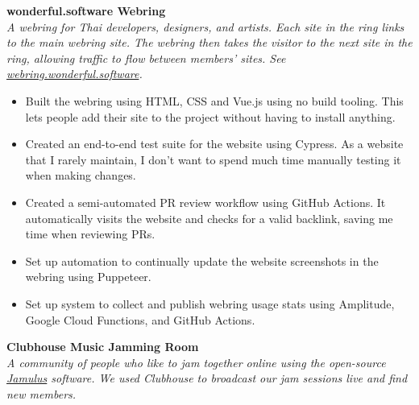 \documentclass[a4paper]{article}
\begin{document}
\textbf{wonderful.software Webring}\\
\textit{A webring for Thai developers, designers, and artists. Each site in the ring links to the main webring site. The webring then takes the visitor to the next site in the ring, allowing traffic to flow between members’ sites. See \href{https://webring.wonderful.software/}{webring.wonderful.software}.}

\begin{itemize} \itemsep 1pt
    
	\item Built the webring using HTML, CSS and Vue.js using no build tooling. This lets people add their site to the project without having to install anything.
    
	\item Created an end-to-end test suite for the website using Cypress. As a website that I rarely maintain, I don’t want to spend much time manually testing it when making changes.
    
	\item Created a semi-automated PR review workflow using GitHub Actions. It automatically visits the website and checks for a valid backlink, saving me time when reviewing PRs.
    
	\item Set up automation to continually update the website screenshots in the webring using Puppeteer.
    
	\item Set up system to collect and publish webring usage stats using Amplitude, Google Cloud Functions, and GitHub Actions.
    
\end{itemize}

\vspace{2mm}

\textbf{Clubhouse Music Jamming Room}\\
\textit{A community of people who like to jam together online using the open-source \href{https://jamulus.io/}{Jamulus} software. We used Clubhouse to broadcast our jam sessions live and find new members.}
\end{document}
